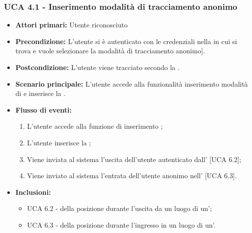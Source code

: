 \subsubsection{UCA 4.1 - Inserimento modalità di tracciamento anonimo}%
\begin{itemize}
	\item \textbf{Attori primari:} Utente riconosciuto
	\item \textbf{Precondizione:} L'utente si è autenticato con le credenziali  nella  in cui si trova e vuole selezionare la modalità di tracciamento anonimo].
	\item \textbf{Postcondizione:} L'utente viene tracciato secondo la .
	\item \textbf{Scenario principale:} L'utente accede alla funzionalità inserimento modalità di  e inserisce la .
	\item \textbf{Flusso di eventi:}
	\begin{enumerate}
	\item L'utente accede alla funzione di inserimento ;
	\item L'utente inserisce la ;
	\item Viene inviata al sistema l'uscita dell'utente autenticato dall' [UCA 6.2];
	\item Viene inviato al sistema l'entrata dell'utente anonimo nell' [UCA 6.3].
	\end{enumerate}
	\item \textbf{Inclusioni:}
	\begin{itemize}
		\item UCA 6.2 -  della posizione durante l'uscita da un luogo di un';
		\item UCA 6.3 -  della posizione durante l'ingresso in un luogo di un'.
	\end{itemize}
\end{itemize}

